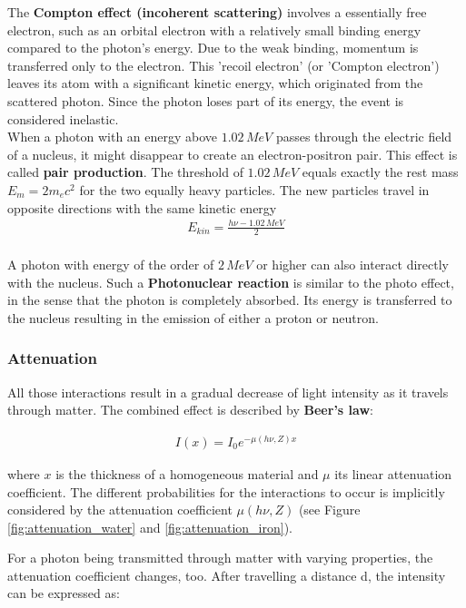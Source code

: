 The \textbf{Compton effect (incoherent scattering)} involves a essentially free electron, such as an orbital electron with a relatively small binding energy compared to the photon's energy.
Due to the weak binding, momentum is transferred only to the electron.
This 'recoil electron' (or 'Compton electron') leaves its atom with a significant kinetic energy, which originated from the scattered photon.
Since the photon loses part of its energy, the event is considered inelastic. \\

When a photon with an energy above $1.02 \, MeV$ passes through the electric field of a nucleus, it might disappear to create an electron-positron pair.
This effect is called \textbf{pair production}.
The threshold of $1.02 \, MeV$ equals exactly the rest mass $E_m = 2m_ec^2$ for the two equally heavy particles.
The new particles travel in opposite directions with the same kinetic energy
\begin{align}
 E_{kin} = \frac{h\nu - 1.02 \, MeV}{2}
\end{align} \\

A photon with energy of the order of $2 \, MeV$ or higher can also interact directly with the nucleus.
Such a \textbf{Photonuclear reaction} is similar to the photo effect, in the sense that the photon is completely absorbed.
Its energy is transferred to the nucleus resulting in the emission of either a proton or neutron. \cite{Podgorsak, Maidment2014}\\

\subsubsection{Attenuation}
All those interactions result in a gradual decrease of light intensity as it travels through matter.
The combined effect is described by \textbf{Beer's law}:

\begin{align}
I(x) = I_0 e^{-\mu(h\nu,Z)x}
\end{align}

where $x$ is the thickness of a homogeneous material and $\mu$ its linear attenuation coefficient.
The different probabilities for the interactions to occur is implicitly considered by the attenuation coefficient $\mu(h\nu,Z)$ (see Figure \ref{fig:attenuation_water} and \ref{fig:attenuation_iron}).

For a photon being transmitted through matter with varying properties, the attenuation coefficient changes, too.
After travelling a distance d, the intensity can be expressed as:

